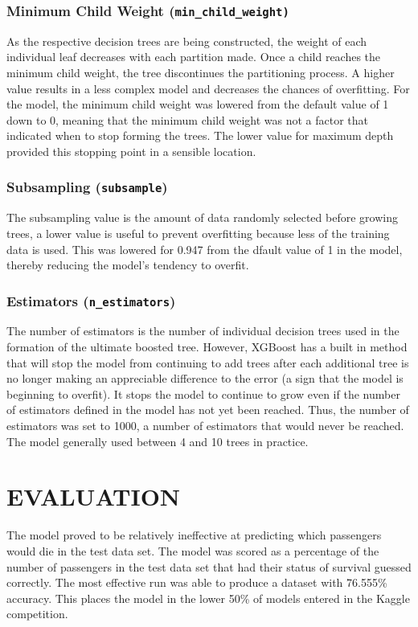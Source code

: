 \documentclass[12pt]{article}
\newcommand{\code}{\texttt}
\begin{document}
      \subsubsection{Minimum Child Weight (\code{min\_child\_weight)}}
        As the respective decision trees are being constructed, the weight of each individual leaf decreases with each partition made. Once a child reaches the minimum child weight, the tree discontinues the partitioning process. A higher value results in a less complex model and decreases the chances of overfitting. For the model, the minimum child weight was lowered from the default value of 1 down to 0, meaning that the minimum child weight was not a factor that indicated when to stop forming the trees. The lower value for maximum depth provided this stopping point in a sensible location.
      \subsubsection{Subsampling (\code{subsample})}
        The subsampling value is the amount of data randomly selected before growing trees, a lower value is useful to prevent overfitting because less of the training data is used. This was lowered for 0.947 from the dfault value of 1 in the model, thereby reducing the model's tendency to overfit.
      \subsubsection{Estimators (\code{n\_estimators})}
        The number of estimators is the number of individual decision trees used in the formation of the ultimate boosted tree. However, XGBoost has a built in method that will stop the model from continuing to add trees after each additional tree is no longer making an appreciable difference to the error (a sign that the model is beginning to overfit). It stops the model to continue to grow even if the number of estimators defined in the model has not yet been reached. Thus, the number of estimators was set to 1000, a number of estimators that would never be reached. The model generally used between 4 and 10 trees in practice.
  \section{EVALUATION}
    The model proved to be relatively ineffective at predicting which passengers would die in the test data set. The model was scored as a percentage of the number of passengers in the test data set that had their status of survival guessed correctly. The most effective run was able to produce a dataset with 76.555\% accuracy. This places the model in the lower 50\% of models entered in the Kaggle competition.
\end{document}
